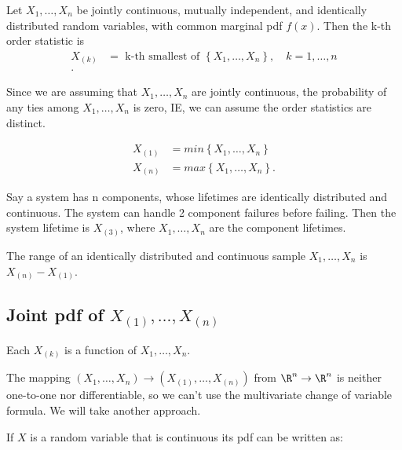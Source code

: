 Let $X_{1} , \ldots , X_{n}$ be jointly continuous, mutually independent, and identically distributed random variables, with common marginal pdf $f\left( x \right) $. Then the k-th order statistic is 
\begin{align*}
	X_{\left( k \right) } &= \text{ k-th smallest of }\left\{ X_{1} , \ldots , X_{n} \right\}  , \quad k = 1, \ldots, n\\
.\end{align*}
\begin{remark}
	Since we are assuming that $X_{1} , \ldots , X_{n}$ are jointly continuous, the probability of any ties among $X_{1} , \ldots , X_{n}$ is zero, IE, we can assume the order statistics are distinct. 
\end{remark}

\begin{eg}
	\begin{align*}
		X_{\left( 1 \right) } &= min\left\{ X_{1} , \ldots , X_{n} \right\} \\
		X_{\left( n \right) } &= max\left\{ X_{1} , \ldots , X_{n} \right\}  
	.\end{align*}
\end{eg}
\begin{eg}
	Say a system has n components, whose lifetimes are identically distributed and continuous. The system can handle 2 component failures before failing. Then the system lifetime is $X_{\left( 3 \right) }$, where $X_{1} , \ldots , X_{n}$ are the component lifetimes.
\end{eg}
\begin{eg}
	The range of an identically distributed and continuous sample $X_{1} , \ldots , X_{n}$ is $X_{\left( n \right) } - X_{\left( 1 \right) }$. 
\end{eg}
\subsection{Joint pdf of $X_{\left( 1 \right) }, \ldots, X_{\left( n \right) }$ }
Each $X_{\left( k \right)}$ is a function of $X_{1} , \ldots , X_{n}$. 

The mapping $\left( X_{1} , \ldots , X_{n} \right) \to \left( X_{\left( 1 \right) } ,\ldots, X_{\left( n \right) } \right) $ from $\R^{n}\to \R^{n}$ is neither one-to-one nor differentiable, so we can't use the multivariate change of variable formula. We will take another approach. 

If $X$ is a random variable that is continuous its pdf can be written as:
